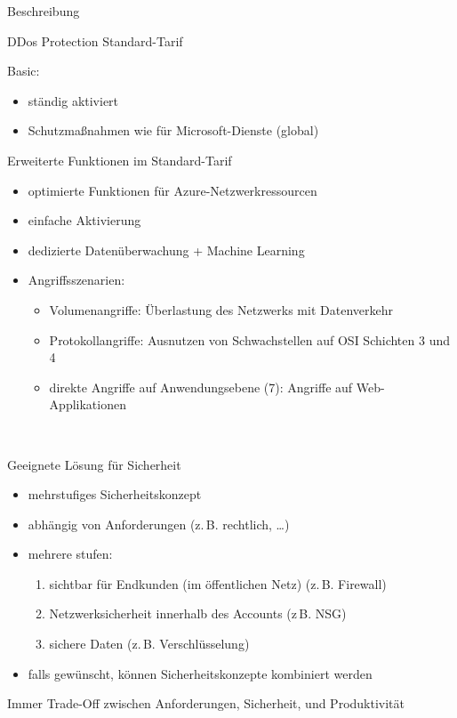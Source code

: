\documentclass{scrartcl}
\newenvironment{flashcard}[2][]{%
    #1
    \vfill
    \centerline{\Large{#2}}
    \vfill
\newpage
}
{\newpage}
\begin{document}
    \begin{flashcard}[Beschreibung]{DDos Protection Standard-Tarif}
        Basic:
        \begin{itemize}
            \item ständig aktiviert
            \item Schutzmaßnahmen wie für Microsoft-Dienste (global)
        \end{itemize}

        Erweiterte Funktionen im Standard-Tarif
        \begin{itemize}
            \item optimierte Funktionen für Azure-Netzwerkressourcen
            \item einfache Aktivierung
            \item dedizierte Datenüberwachung + Machine Learning
            \item Angriffsszenarien:
            \begin{itemize}
                \item Volumenangriffe: Überlastung des Netzwerks mit Datenverkehr
                \item Protokollangriffe: Ausnutzen von Schwachstellen auf OSI Schichten 3 und 4
                \item direkte Angriffe auf Anwendungsebene (7): Angriffe auf Web-Applikationen
            \end{itemize}

        \end{itemize}
    \end{flashcard}

    \begin{flashcard}[\ ]{Geeignete Lösung für Sicherheit}
        \begin{itemize}
            \item mehrstufiges Sicherheitskonzept
            \item abhängig von Anforderungen (z.\,B. rechtlich, \ldots)
            \item mehrere stufen:\newline
            \begin{enumerate}
                \item sichtbar für Endkunden (im öffentlichen Netz) (z.\,B. Firewall)
                \item Netzwerksicherheit innerhalb des Accounts (z\,B. NSG)
                \item sichere Daten (z.\,B. Verschlüsselung)
            \end{enumerate}
            \item falls gewünscht, können Sicherheitskonzepte kombiniert werden
        \end{itemize}
        Immer Trade-Off zwischen Anforderungen, Sicherheit, und Produktivität
    \end{flashcard}
\end{document}
